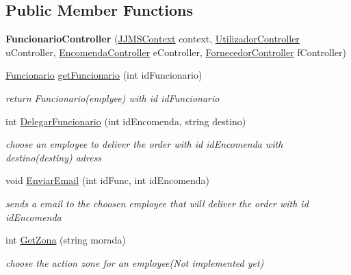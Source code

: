 \subsection*{Public Member Functions}
\begin{DoxyCompactItemize}
\item 
\mbox{\label{classmvc_j_j_m_s_1_1_controllers_1_1_funcionario_controller_a757c0fb82ba396715b90fc32f6d9a0a2}} 
{\bfseries Funcionario\+Controller} (\mbox{\hyperlink{classmvc_j_j_m_s_1_1_data_1_1_j_j_m_s_context}{J\+J\+M\+S\+Context}} context, \mbox{\hyperlink{classmvc_j_j_m_s_1_1_controllers_1_1_utilizador_controller}{Utilizador\+Controller}} u\+Controller, \mbox{\hyperlink{classmvc_j_j_m_s_1_1_controllers_1_1_encomenda_controller}{Encomenda\+Controller}} e\+Controller, \mbox{\hyperlink{classmvc_j_j_m_s_1_1_controllers_1_1_fornecedor_controller}{Fornecedor\+Controller}} f\+Controller)
\item 
\mbox{\hyperlink{classmvc_j_j_m_s_1_1_models_1_1_funcionario}{Funcionario}} \mbox{\hyperlink{classmvc_j_j_m_s_1_1_controllers_1_1_funcionario_controller_a921dda2edb269dfe9a32be22d5abe2ad}{get\+Funcionario}} (int id\+Funcionario)
\begin{DoxyCompactList}\small\item\em return Funcionario(emplyee) with id id\+Funcionario \end{DoxyCompactList}\item 
int \mbox{\hyperlink{classmvc_j_j_m_s_1_1_controllers_1_1_funcionario_controller_a1f66cb42a2fb59a0eaacbcc570cea3ad}{Delegar\+Funcionario}} (int id\+Encomenda, string destino)
\begin{DoxyCompactList}\small\item\em choose an employee to deliver the order with id id\+Encomenda with destino(destiny) adress \end{DoxyCompactList}\item 
void \mbox{\hyperlink{classmvc_j_j_m_s_1_1_controllers_1_1_funcionario_controller_a248cbcd4b3b00e2979d7f6b1ce926505}{Enviar\+Email}} (int id\+Func, int id\+Encomenda)
\begin{DoxyCompactList}\small\item\em sends a email to the choosen employee that will deliver the order with id id\+Encomenda \end{DoxyCompactList}\item 
int \mbox{\hyperlink{classmvc_j_j_m_s_1_1_controllers_1_1_funcionario_controller_a3fc608b887a43ddf67041f09bab3aae5}{Get\+Zona}} (string morada)
\begin{DoxyCompactList}\small\item\em choose the action zone for an employee(\+Not implemented yet) \end{DoxyCompactList}\end{DoxyCompactItemize}


